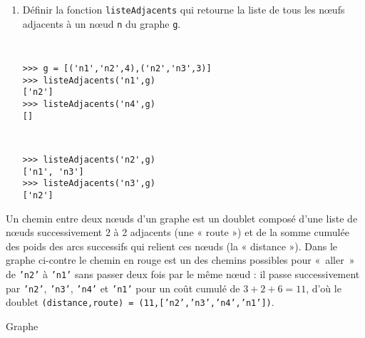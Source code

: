 \begin{question}
\begin{enumerate}
\item Définir la fonction \texttt{listeAdjacents} qui retourne la liste de tous les n\oe ufs
	adjacents à un n\oe ud \texttt{n} du graphe \texttt{g}.

\noindent\begin{minipage}[t]{6cm}\tt\footnotesize
\begin{Verbatim}
>>> g = [('n1','n2',4),('n2','n3',3)]
>>> listeAdjacents('n1',g)
['n2']
>>> listeAdjacents('n4',g)
[]
\end{Verbatim}
\end{minipage}
\hfill
\begin{minipage}[t]{6cm}\tt\footnotesize
\begin{Verbatim}
>>> listeAdjacents('n2',g)
['n1', 'n3']
>>> listeAdjacents('n3',g)
['n2']
\end{Verbatim}
\end{minipage}
\vspace*{2mm}

\end{enumerate}
\end{question}

\noindent
\begin{minipage}{10cm}
Un chemin entre deux n\oe uds d'un graphe est un doublet composé
d'une liste de n\oe uds successivement 2 à 2 adjacents (une « route ») et 
de la somme cumulée des poids des arcs successifs qui relient ces n\oe uds (la « distance »).
Dans le graphe ci-contre le chemin en rouge %
est un des chemins possibles pour «~aller~» de \texttt{'n2'} à \texttt{'n1'}
sans passer deux fois par le même n\oe ud : il passe successivement par \texttt{'n2'},
\texttt{'n3'}, \texttt{'n4'} et \texttt{'n1'} pour un coût cumulé de $3+2+6 = 11$,
d'où le doublet \texttt{(distance,route) = (11,['n2','n3','n4','n1'])}.
\end{minipage}
\hfill
\begin{minipage}{4cm}
Graphe\\
\end{minipage}

